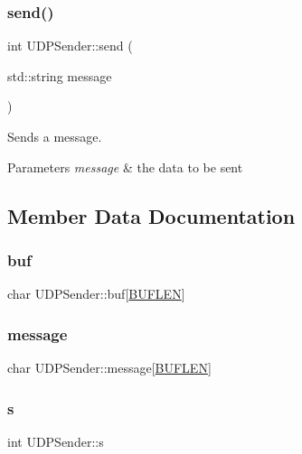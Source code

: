 \subsubsection{\texorpdfstring{send()}{send()}}
{\footnotesize\ttfamily int U\+D\+P\+Sender\+::send (\begin{DoxyParamCaption}\item[{std\+::string}]{message }\end{DoxyParamCaption})}



Sends a message. 


\begin{DoxyParams}{Parameters}
{\em message} & the data to be sent \\
\hline
\end{DoxyParams}


\subsection{Member Data Documentation}
\hypertarget{class_u_d_p_sender_a21073b873007a83ac5bec30bcce8fd43}{}\label{class_u_d_p_sender_a21073b873007a83ac5bec30bcce8fd43} 
\subsubsection{\texorpdfstring{buf}{buf}}
{\footnotesize\ttfamily char U\+D\+P\+Sender\+::buf\mbox{[}\hyperlink{_u_d_p_sender_8h_ad974fe981249f5e84fbf1683b012c9f8}{B\+U\+F\+L\+EN}\mbox{]}}

\hypertarget{class_u_d_p_sender_a738a29b72c2c7fe5655e74cd4ee0e077}{}\label{class_u_d_p_sender_a738a29b72c2c7fe5655e74cd4ee0e077} 
\subsubsection{\texorpdfstring{message}{message}}
{\footnotesize\ttfamily char U\+D\+P\+Sender\+::message\mbox{[}\hyperlink{_u_d_p_sender_8h_ad974fe981249f5e84fbf1683b012c9f8}{B\+U\+F\+L\+EN}\mbox{]}}

\hypertarget{class_u_d_p_sender_aeb3773ffb3bc9549dbe73c0e7fee0f23}{}\label{class_u_d_p_sender_aeb3773ffb3bc9549dbe73c0e7fee0f23} 
\subsubsection{\texorpdfstring{s}{s}}
{\footnotesize\ttfamily int U\+D\+P\+Sender\+::s}

